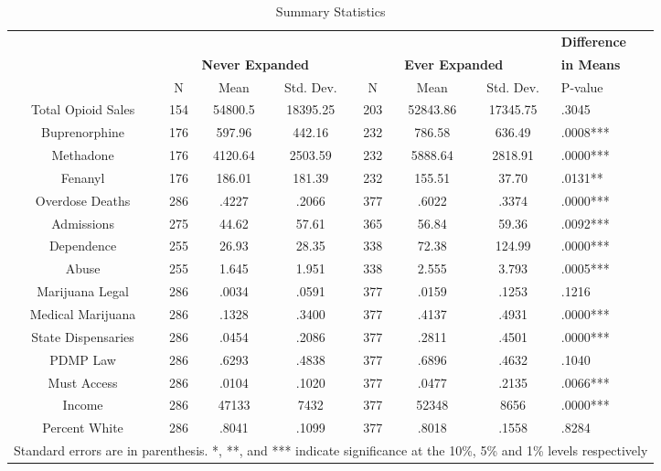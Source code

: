 \documentclass[11pt]{article}
\begin{document}
\begin{table}[htb]
\caption{Summary Statistics} 
\label{summary statistics}
\begin{adjustbox}{width=\textwidth,keepaspectratio}
\begin{tabular}{c|ccc|ccc|l}
 \multicolumn{7}{c|}{} & \textbf{Difference} \\
& \multicolumn{3}{|c|}{\textbf{Never Expanded}} & \multicolumn{3}{|c|}{\textbf{Ever Expanded}} & \textbf{in Means} \\ 
\hline \hline
 & N & Mean & Std. Dev. & N & Mean & Std. Dev. & P-value\\ \hline
Total Opioid Sales &154 & 54800.5 & 18395.25 & 203 & 52843.86 & 17345.75 & .3045\\
Buprenorphine &176 & 597.96 & 442.16 & 232 & 786.58 & 636.49 & .0008***\\
Methadone &176 & 4120.64 & 2503.59 & 232 & 5888.64 & 2818.91 & .0000***\\
Fenanyl  &176 & 186.01 & 181.39 & 232 & 155.51 & 37.70 & .0131**\\
Overdose Deaths  &286 & .4227 & .2066 & 377 & .6022 & .3374 & .0000***\\
Admissions  &275 & 44.62 & 57.61 & 365 & 56.84 & 59.36 & .0092***\\
Dependence  &255 & 26.93 & 28.35 & 338 & 72.38 & 124.99 & .0000***\\
Abuse  &255 & 1.645 & 1.951 & 338 & 2.555 & 3.793 & .0005***\\
Marijuana Legal  &286 & .0034 & .0591 & 377 & .0159 & .1253 & .1216\\
Medical Marijuana  &286 & .1328 & .3400 & 377 & .4137 & .4931 & .0000***\\
State Dispensaries &286 & .0454 & .2086 & 377 & .2811 & .4501 & .0000***\\
PDMP Law  &286 & .6293 & .4838 & 377 & .6896 & .4632 & .1040\\ 
Must Access  &286 & .0104 & .1020 & 377 & .0477 & .2135 & .0066***\\
Income  &286 & 47133 & 7432 & 377 & 52348 & 8656 & .0000***\\
Percent White  &286 & .8041 & .1099 & 377 & .8018 & .1558 & .8284\\
\hline
\multicolumn{8}{c}{\footnotesize{Standard errors are in parenthesis.  *, **, and *** indicate significance at the 10\%, 5\% and 1\% levels respectively}} \\


\hline
\end{tabular}
\end{adjustbox}
\end{table}
\end{document}
